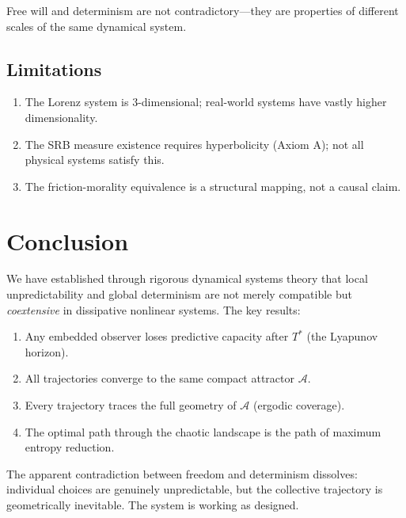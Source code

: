 \documentclass[12pt, a4paper]{article}
\theoremstyle{plain}
\theoremstyle{definition}
\theoremstyle{remark}
\newcommand{\calA}{\mathcal{A}}
\begin{document}
Free will and determinism are not contradictory---they are properties
of different scales of the same dynamical system.

\subsection{Limitations}

\begin{enumerate}
  \item The Lorenz system is 3-dimensional; real-world systems have
    vastly higher dimensionality.
  \item The SRB measure existence requires hyperbolicity (Axiom A);
    not all physical systems satisfy this.
  \item The friction-morality equivalence is a structural mapping, not
    a causal claim.
\end{enumerate}

\section{Conclusion}\label{sec:conclusion}

We have established through rigorous dynamical systems theory that local
unpredictability and global determinism are not merely compatible but
\emph{coextensive} in dissipative nonlinear systems. The key results:

\begin{enumerate}
  \item Any embedded observer loses predictive capacity after $T^*$
    (the Lyapunov horizon).
  \item All trajectories converge to the same compact attractor $\calA$.
  \item Every trajectory traces the full geometry of $\calA$ (ergodic
    coverage).
  \item The optimal path through the chaotic landscape is the path
    of maximum entropy reduction.
\end{enumerate}

The apparent contradiction between freedom and determinism dissolves:
individual choices are genuinely unpredictable, but the collective
trajectory is geometrically inevitable. The system is working as designed.

\end{document}
